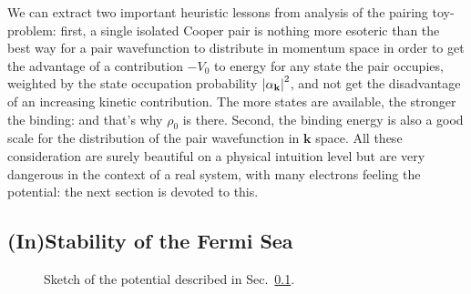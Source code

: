 We can extract two important heuristic lessons from analysis of the pairing toy-problem: first, a single isolated Cooper pair is nothing more esoteric than the best way for a pair wavefunction to distribute in momentum space in order to get the advantage of a contribution $-V_0$ to energy for any state the pair occupies, weighted by the state occupation probability $\abs{\alpha_\mathbf{k}}^2$, and not get the disadvantage of an increasing kinetic contribution. The more states are available, the stronger the binding: and that's why $\rho_0$ is there. Second, the binding energy is also a good scale for the distribution of the pair wavefunction in $\mathbf{k}$ space. All these consideration are surely beautiful on a physical intuition level but are very dangerous in the context of a real system, with many electrons feeling the potential: the next section is devoted to this.

\subsection{(In)Stability of the Fermi Sea}\label{subsec:(in)stability of the fermi sea}

\begin{figure}
	\centering
	
	\caption{Sketch of the potential described in Sec.~\ref{subsec:(in)stability of the fermi sea}.}
	\label{fig:fermi sphere and shell extended}
\end{figure}

